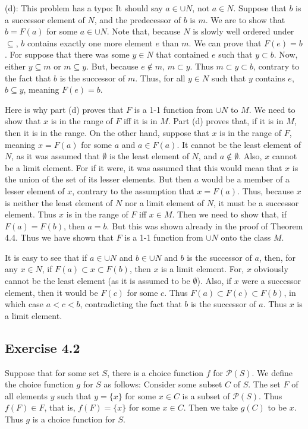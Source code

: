 \documentclass{article}
\theoremstyle{definition}
\begin{document}
(d): This problem has a typo: It should say $a\in\cup N$, not $a\in N$. Suppose that $b$ is a successor element of $N$, and the predecessor of $b$ is 
$m$. We are to show that $b=F(a)$ for some $a\in\cup N$. 
Note that, because $N$ is slowly well ordered under $\subseteq$, $b$ contains exactly one more element $e$ than $m$. We can prove that 
$F(e)=b$. For suppose that there was some $y\in N$ that contained $e$ such that $y\subset b$. Now, either 
$y\subseteq m$ or $m\subseteq y$. But, because $e\notin m$, $m\subset y$. Thus $m\subset y\subset b$, contrary to the fact that 
$b$ is the successor of $m$. Thus, for all $y\in N$ such that $y$ contains $e$, $b\subseteq y$, meaning $F(e)=b$.

Here is why part (d) proves that $F$ is a 1-1 function from $\cup N$ to $M$. We need to show that $x$ is in the range of $F$ iff it is in $M$. Part (d) proves that, 
if it is in $M$, then it is in the range. On the other hand, suppose that $x$ is in the range of $F$, meaning $x=F(a)$ for some $a$ and $a\in F(a)$. 
It cannot be the least element of $N$, as it was assumed that $\emptyset$ is the least element of $N$, and $a\notin\emptyset$. Also, 
$x$ cannot be a limit element. For if it were, it was assumed that this would mean that $x$ is the union of the set of its lesser elements. But then 
$a$ would be a member of a lesser element of $x$, contrary to the assumption that $x=F(a)$. Thus, because $x$ is neither the least element of $N$ nor 
a limit element of $N$, it must be a successor element. Thus $x$ is in the range of $F$ iff $x\in M$. Then we need to show that, 
if $F(a)=F(b)$, then $a=b$. But this was shown already in the proof of Theorem 4.4. Thus we have shown that $F$ is a 1-1 function from $\cup N$ 
onto the class $M$.

It is easy to see that if $a\in\cup N$ and $b\in\cup N$ and $b$ is the successor of $a$, then, for any $x\in N$, if 
$F(a)\subset x\subset F(b)$, then $x$ is a limit element. For, $x$ obviously cannot be the least element (as 
it is assumed to be $\emptyset$). Also, if $x$ were a successor element, then it would be $F(c)$ for some 
$c$. Thus $F(a)\subset F(c)\subset F(b)$, in which case $a<c<b$, contradicting the fact that $b$ is the successor of 
$a$. Thus $x$ is a limit element.

\subsection*{Exercise 4.2}
Suppose that for some set $S$, there is a choice function $f$ for $\mathcal{P}(S)$. We define the choice function $g$ for $S$ as follows: 
Consider some subset $C$ of $S$. The set $F$ of all elements 
$y$ such that $y=\{x\}$ for some $x\in C$ is a subset of $\mathcal{P}(S)$. Thus $f(F)\in F$, that is, $f(F)=\{x\}$ for 
some $x\in C$. Then we take $g(C)$ to be $x$. Thus $g$ is a choice function for $S$.
\end{document}
